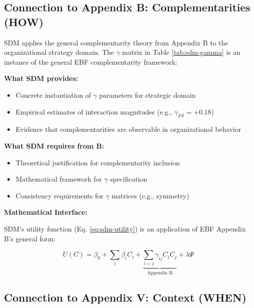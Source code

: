 \subsection{Connection to Appendix B: Complementarities (HOW)}

SDM applies the general complementarity theory from Appendix B to the organizational strategy domain. The $\gamma$ matrix in Table \ref{tab:sdm-gamma} is an instance of the general EBF complementarity framework:

\begin{tcolorbox}[colback=yellow!5!white, colframe=yellow!75!black,
    title=Integration: SDM $\leftrightarrow$ Appendix B (HOW)]

\textbf{What SDM provides:}
\begin{itemize}[nosep]
\item Concrete instantiation of $\gamma$ parameters for strategic domain
\item Empirical estimates of interaction magnitudes (e.g., $\gamma_{FS} = +0.18$)
\item Evidence that complementarities are observable in organizational behavior
\end{itemize}

\textbf{What SDM requires from B:}
\begin{itemize}[nosep]
\item Theoretical justification for complementarity inclusion
\item Mathematical framework for $\gamma$ specification
\item Consistency requirements for $\gamma$ matrices (e.g., symmetry)
\end{itemize}

\textbf{Mathematical Interface:}

SDM's utility function (Eq. \ref{eq:sdm-utility}) is an application of EBF Appendix B's general form:

\begin{equation}
U(C) = \beta_0 + \sum_i \beta_i C_i + \underbrace{\sum_{i<j} \gamma_{ij} C_i C_j}_{\text{Appendix B}} + \lambda \Psi
\end{equation}

\end{tcolorbox}

\subsection{Connection to Appendix V: Context (WHEN)}

